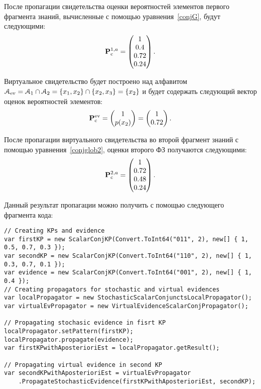 После пропагации свидетельства оценки вероятностей элементов первого фрагмента знаний, вычисленные с помощью уравнения~\ref{conjG}, будут следующими:
\begin{equation*}
\mathbf{P}_\mathrm{c}^{1,a} = \begin{pmatrix}
1 \\  0.4 \\ 0.72 \\ 0.24
\end{pmatrix}.
\end{equation*}

Виртуальное свидетельство будет построено над алфавитом $\mathcal{A}_{\mathrm{ev}} = \mathcal{A}_1 \cap \mathcal{A}_2 = \{x_1, x_2\} \cap \{x_2, x_3\} = \{x_2\}$ и будет содержать следующий вектор оценок вероятностей элементов:
\begin{equation*}
\mathbf{P}_\mathrm{c}^{\mathrm{ev}} = \begin{pmatrix}  1 \\ p(x_2)	\end{pmatrix} = 
\begin{pmatrix} 1 \\ 0.72 \end{pmatrix}.
\end{equation*}

После пропагации виртуального свидетельства во второй фрагмент знаний с помощью уравнения~\ref{conjglob2}, оценки второго ФЗ получаются следующими:
\begin{equation*}
\mathbf{P}_\mathrm{c}^{2,a} = \begin{pmatrix}
1 \\ 0.72 \\ 0.48 \\ 0.24
\end{pmatrix}.
\end{equation*}

Данный результат пропагации можно получить с помощью следующего фрагмента кода:

\begin{lstlisting}[caption = Пример пропагации виртуального свидетельства]
// Creating KPs and evidence
var firstKP = new ScalarConjKP(Convert.ToInt64("011", 2), new[] { 1, 0.5, 0.7, 0.3 });
var secondKP = new ScalarConjKP(Convert.ToInt64("110", 2), new[] { 1, 0.3, 0.7, 0.1 });
var evidence = new ScalarConjKP(Convert.ToInt64("001", 2), new[] { 1, 0.4 });
// Creating propagators for stochastic and virtual evidences
var localPropagator = new StochasticScalarConjunctsLocalPropagator();
var virtualEvPropagator = new VirtualEvidenceScalarConjPropagator();

// Propagating stochasic evidence in fisrt KP
localPropagator.setPattern(firstKP);
localPropagator.propagate(evidence);
var firstKPwithAposterioriEst = localPropagator.getResult();

// Propagating virtual evidence in second KP
var secondKPwithAposterioriEst = virtualEvPropagator
    .PropagateStochasticEvidence(firstKPwithAposterioriEst, secondKP);
\end{lstlisting}

